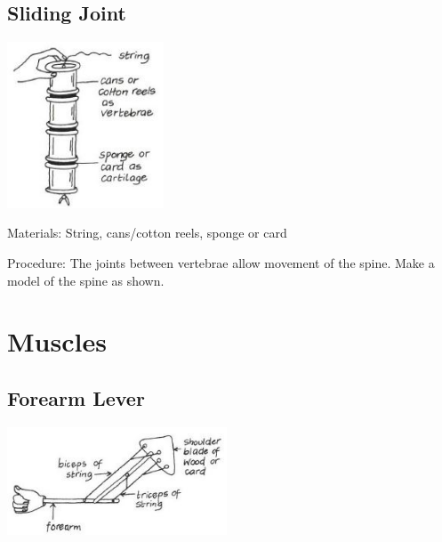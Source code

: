 \begin{multicols}{2}
\subsection{Sliding Joint}

\begin{center}
\includegraphics[width=0.35\textwidth]{./img/vso/sliding-joint.jpg}
\end{center}

\begin{description*}
\item[Materials:]{String, cans/cotton reels, sponge or card}
\item[Procedure:]{The joints between vertebrae
allow movement of the spine.
Make a model of the spine as
shown.}
\end{description*}


\section*{Muscles}


\subsection{Forearm Lever}

\begin{center}
\includegraphics[width=0.49\textwidth]{./img/vso/forearm.jpg}
\end{center}


\end{multicols}
